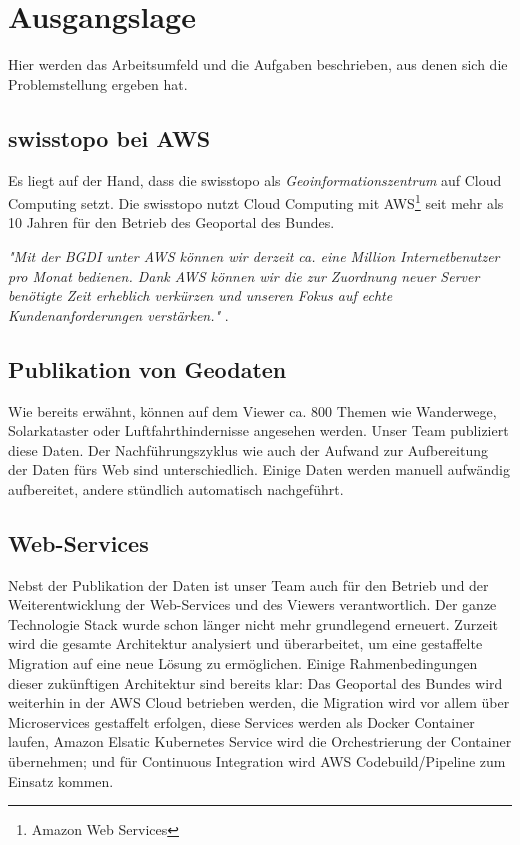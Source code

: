 \section{Ausgangslage}
Hier werden das Arbeitsumfeld und die Aufgaben beschrieben, aus denen sich die Problemstellung ergeben hat.

\subsection{swisstopo bei AWS}
Es liegt auf der Hand, dass die swisstopo als \emph{Geoinformationszentrum} auf Cloud Computing setzt. Die swisstopo nutzt Cloud Computing mit AWS\footnote{Amazon Web Services} seit mehr als 10 Jahren für den Betrieb des Geoportal des Bundes.
 
\textit{"Mit der BGDI unter AWS können wir derzeit ca. eine Million Internetbenutzer pro Monat bedienen. Dank AWS können wir die zur Zuordnung neuer Server benötigte Zeit erheblich verkürzen und unseren Fokus auf echte Kundenanforderungen verstärken."} \cite{Christ2020}.


\subsection{Publikation von Geodaten}
Wie bereits erwähnt, können auf dem Viewer ca. 800 Themen wie Wanderwege, Solarkataster oder Luftfahrthindernisse angesehen werden. Unser Team publiziert diese Daten. Der Nachführungszyklus wie auch der Aufwand zur
Aufbereitung der Daten fürs Web sind unterschiedlich. Einige Daten werden manuell aufwändig aufbereitet, andere
stündlich automatisch nachgeführt.

\subsection{Web-Services}
Nebst der Publikation der Daten ist unser Team auch für den Betrieb und der Weiterentwicklung der Web-Services
und des Viewers verantwortlich. Der ganze Technologie Stack wurde schon länger nicht mehr grundlegend erneuert. Zurzeit wird
die gesamte Architektur analysiert und überarbeitet, um eine gestaffelte Migration auf eine neue
Lösung zu ermöglichen.
Einige Rahmenbedingungen dieser zukünftigen Architektur sind bereits klar: Das Geoportal des
Bundes wird weiterhin in der AWS Cloud betrieben werden, die Migration wird vor allem über
Microservices gestaffelt erfolgen, diese Services werden als Docker Container laufen, Amazon
Elsatic Kubernetes Service wird die Orchestrierung der Container übernehmen; und für Continuous
Integration wird AWS Codebuild/Pipeline zum Einsatz kommen.

